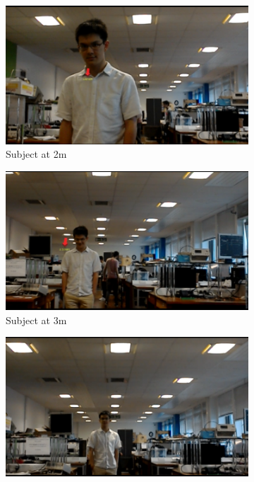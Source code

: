 \begin{figure}[ht]
    \begin{subfigure}[b]{.32\textwidth}
        \centering
        \includegraphics[width=1.0\linewidth]{img/chapter6_test/marek.png}
        \caption{Subject at 2m}
    \end{subfigure}%
    \hspace{\fill} 
    \begin{subfigure}[b]{.32\textwidth}
        \centering
        \includegraphics[width=1.0\linewidth]{img/chapter6_test/marek1.png}
        \caption{Subject at 3m}
    \end{subfigure}
    \hspace{\fill} 
    \begin{subfigure}[b]{.32\textwidth}
        \centering
        \includegraphics[width=1.0\linewidth]{img/chapter6_test/marek2.png}

\end{subfigure}
\end{figure}

